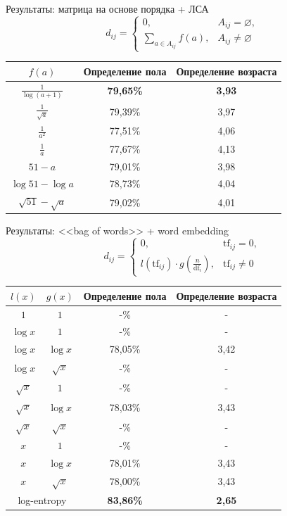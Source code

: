 \documentclass{beamer}
\begin{document}
\begin{frame}{Результаты: матрица на основе порядка + ЛСА}
    \[d_{ij} = \begin{cases}
              0,& A_{ij} = \varnothing,\\
              \sum\limits_{a \in A_{ij}}{f(a)},& A_{ij} \ne \varnothing
          \end{cases}\]
\begin{table}[!h]
\centering
\begin{tabular}{|c|c|c|}\hline
    \boldmath$f(a)$ & \textbf{Определение пола} & \textbf{Определение возраста} \\\hline
    $\frac{1}{\log(a + 1)}$ & \textbf{79,65\%} & \textbf{3,93} \\\hline
    $\frac{1}{\sqrt{a}}$ & 79,39\% & 3,97 \\\hline
    $\frac{1}{a^2}$ & 77,51\% & 4,06 \\\hline
    $\frac{1}{a}$ & 77,67\% & 4,13 \\\hline
    $51 - a$ & 79,01\% & 3,98 \\\hline
    $\log{51} - \log{a}$ & 78,73\% & 4,04 \\\hline
    $\sqrt{51} - \sqrt{a}$ & 79,02\% & 4,01 \\\hline
\end{tabular}
\end{table}
\end{frame}

\begin{frame}{Результаты: <<bag of words>> + word embedding}
    \[d_{ij} = \begin{cases}
              0,& \mathrm{tf}_{ij} = 0,\\
              l(\mathrm{tf}_{ij}) \cdot g(\frac{n}{\mathrm{df}_{i}}),& \mathrm{tf}_{ij} \ne 0
        \end{cases}\]
\begin{table}[!h]
\centering
\begin{tabular}{|c|c|c|c|}\hline
    \boldmath$l(x)$ & \boldmath$g(x)$ & \textbf{Определение пола} & \textbf{Определение возраста} \\\hline
    $1$ & $1$ & -\% & - \\\hline
    $\log{x}$ & $1$ & -\% & - \\\hline
    $\log{x}$ & $\log{x}$ & 78,05\% & 3,42 \\\hline
    $\log{x}$ & $\sqrt{x}$ & -\% & - \\\hline
    $\sqrt{x}$ & $1$ & -\% & - \\\hline
    $\sqrt{x}$ & $\log{x}$ & 78,03\% & 3,43 \\\hline
    $\sqrt{x}$ & $\sqrt{x}$ & -\% & - \\\hline
    $x$ & $1$ & -\% & - \\\hline
    $x$ & $\log{x}$ & 78,01\% & 3,43 \\\hline
    $x$ & $\sqrt{x}$ & 78,00\% & 3,43 \\\hline
    \multicolumn{2}{|c|}{log-entropy} & \textbf{83,86\%} & \textbf{2,65} \\\hline
\end{tabular}
\end{table}
\end{frame}
\end{document}
